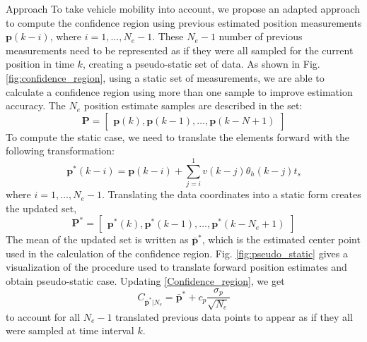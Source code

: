 \begin{section}{Approach}
To take vehicle mobility into account, we propose an adapted approach to compute the confidence region using previous estimated position measurements $\bm{p}(k-i)$, where $i=1,\dots,N_e-1$. These $N_e-1$ number of previous measurements need to be represented as if they were all sampled for the current position in time $k$, creating a pseudo-static set of data. As shown in Fig. \ref{fig:confidence_region}, using a static set of measurements, we are able to calculate a confidence region using more than one sample to improve estimation accuracy. The $N_e$ position estimate samples are described in the set:
\begin{equation}
    \bm{P}=\begin{bmatrix} \bm{p}(k) ,\bm{p}(k-1),\dots,\bm{p}(k-N+1) \end{bmatrix} 
\end{equation}
To compute the static case, we need to translate the elements forward with the following transformation:
	\begin{equation}
	\bm{p}^*(k-i) = \bm{p}(k-i)+\sum_{j=i}^1 v(k-j)\theta_h(k-j)t_s 
	\end{equation}
where $i=1,\dots,N_e-1$. Translating the data coordinates into a static form creates the updated set,
\begin{equation}
    \bm{P}^*=\begin{bmatrix} \bm{p}^*(k) ,\bm{p}^*(k-1),\dots,\bm{p}^*(k-N_e+1) \end{bmatrix} \nonumber
\end{equation}
The mean of the updated set is written as $\bar{\bm{p}}^*$, which is the estimated center point used in the calculation of the confidence region. Fig. \ref{fig:pseudo_static} gives a visualization of the procedure used to translate forward position estimates and obtain pseudo-static case. Updating \eqref{Confidence_region}, we get
    \begin{equation}
    \label{Confidence_region_updated}
		C_{\bar{\bm{p}}^*|N_e} = \bar{\bm{p}}^* + c_p\frac{\sigma_p}{\sqrt{N_e}}
	\end{equation}
 to account for all $N_e-1$ translated previous data points to appear as if they all were sampled at time interval $k$.




\end{section}
